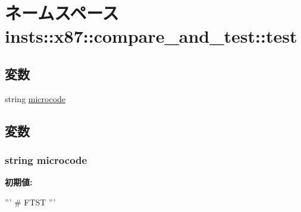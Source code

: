 \hypertarget{namespaceinsts_1_1x87_1_1compare__and__test_1_1test}{
\section{ネームスペース insts::x87::compare\_\-and\_\-test::test}
\label{namespaceinsts_1_1x87_1_1compare__and__test_1_1test}
}
\subsection*{変数}
\begin{DoxyCompactItemize}
\item 
string \hyperlink{namespaceinsts_1_1x87_1_1compare__and__test_1_1test_a770f11a173e99389a8802f0107ed8f52}{microcode}
\end{DoxyCompactItemize}


\subsection{変数}
\hypertarget{namespaceinsts_1_1x87_1_1compare__and__test_1_1test_a770f11a173e99389a8802f0107ed8f52}{
\subsubsection[{microcode}]{\setlength{\rightskip}{0pt plus 5cm}string {\bf microcode}}}
\label{namespaceinsts_1_1x87_1_1compare__and__test_1_1test_a770f11a173e99389a8802f0107ed8f52}
{\bfseries 初期値:}
\begin{DoxyCode}
'''
# FTST
'''
\end{DoxyCode}
